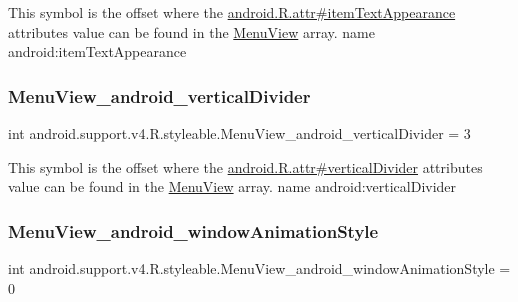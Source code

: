 This symbol is the offset where the \hyperlink{}{android.\+R.\+attr\#item\+Text\+Appearance} attribute\textquotesingle{}s value can be found in the \hyperlink{classandroid_1_1support_1_1v4_1_1R_1_1styleable_a6f981f3b295d914b69b142c57cdfcabf}{Menu\+View} array.  name android\+:item\+Text\+Appearance \mbox{\label{classandroid_1_1support_1_1v4_1_1R_1_1styleable_af14763212ce7ca49cc48e32a6a0f5cd2}} 
\subsubsection{\texorpdfstring{Menu\+View\+\_\+android\+\_\+vertical\+Divider}{MenuView\_android\_verticalDivider}}
{\footnotesize\ttfamily int android.\+support.\+v4.\+R.\+styleable.\+Menu\+View\+\_\+android\+\_\+vertical\+Divider = 3\hspace{0.3cm}{\ttfamily [static]}}

This symbol is the offset where the \hyperlink{}{android.\+R.\+attr\#vertical\+Divider} attribute\textquotesingle{}s value can be found in the \hyperlink{classandroid_1_1support_1_1v4_1_1R_1_1styleable_a6f981f3b295d914b69b142c57cdfcabf}{Menu\+View} array.  name android\+:vertical\+Divider \mbox{\label{classandroid_1_1support_1_1v4_1_1R_1_1styleable_a69e7a03d136e8951fa5421ee2396b18b}} 
\subsubsection{\texorpdfstring{Menu\+View\+\_\+android\+\_\+window\+Animation\+Style}{MenuView\_android\_windowAnimationStyle}}
{\footnotesize\ttfamily int android.\+support.\+v4.\+R.\+styleable.\+Menu\+View\+\_\+android\+\_\+window\+Animation\+Style = 0\hspace{0.3cm}{\ttfamily [static]}}

